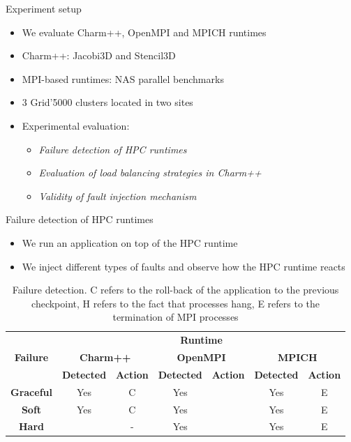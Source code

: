 \documentclass[11pt,xcolor=dvipsnames,presentation]{beamer}
\begin{document}
\begin{frame}[label=sec-3-0-8]{Experiment setup}
\begin{itemize}
\item We evaluate Charm++, OpenMPI and MPICH runtimes
\item Charm++: Jacobi3D and Stencil3D
\item MPI-based runtimes:  NAS parallel benchmarks

\item 3 Grid'5000 clusters located in two sites

\item Experimental evaluation:
\begin{itemize}
\item \alert{\emph{Failure detection of HPC runtimes}}
\item \alert{\emph{Evaluation of load balancing strategies in Charm++}}
\item \emph{Validity of fault injection mechanism}
\end{itemize}
\end{itemize}
\end{frame}
\begin{frame}[label=sec-3-0-9]{Failure detection of HPC runtimes}
\begin{itemize}
\item We run an application on top of the HPC runtime
\item We inject different types of faults and observe how the HPC runtime reacts
\end{itemize}


\begin{table}[ht!]
  { \scriptsize
  \begin{tabular}{|c|c|c|c|c|c|c|}
  \hline
  \multirow{3}{*}{\textbf{Failure}} &
  \multicolumn{6}{c|}{\textbf{Runtime}}  \\
  \cline{1-7}
  &\multicolumn{2}{c}{\textbf{Charm++}}&
  \multicolumn{2}{|c}{\textbf{OpenMPI}}&
  \multicolumn{2}{|c|}{\textbf{MPICH}}\\
  \cline{2-7}
  &\textbf{Detected} & \textbf{Action} & \textbf{Detected} & \textbf{Action} & \textbf{Detected} & \textbf{Action}  \\
  \hline
  \textbf{Graceful}  &   Yes  & C   &  Yes   &  \color{red}{H}  &  Yes   &  E   \\
  \textbf{Soft}  &       Yes  & C   &  Yes   &  \color{red}{H}  &  Yes   &  E   \\
  \textbf{Hard}   &      \color{red}{No}   & -   &  Yes   &  \color{red}{H}  &  Yes   &  E   \\
  \hline
  \end{tabular}
  }
  \caption{Failure detection. C refers to the roll-back of the application to the previous checkpoint,
  H refers to the fact that processes hang, E refers to the termination of MPI processes}
  \label{table:assess_HPC_runtimes}
\end{table}
\end{frame}
\end{document}
